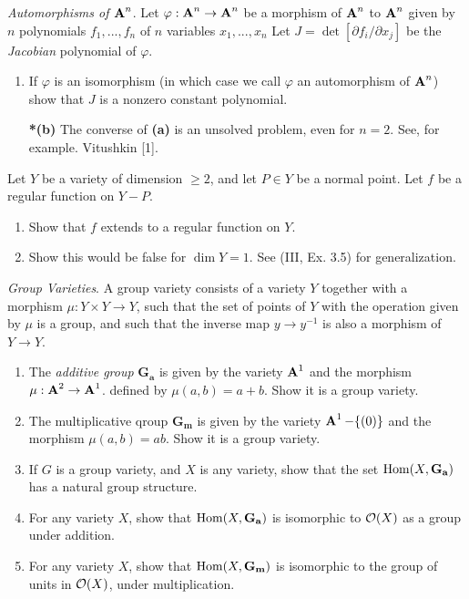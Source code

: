 \documentclass[10pt]{amsart}
\begin{document}
\begin{exercise}[3.19]
    \emph{Automorphisms of $\aa^n$}. Let $\varphi: \aa^n \to \aa^n$ be a morphism of $\aa^n$ to $\aa^n$ given 
    by $n$ polynomials $f_1, ... ,f_n$ of $n$ variables $x_1, ... ,x_n$ Let $J = \det [\partial f_i/\partial x_j] $ 
    be the \emph{Jacobian} polynomial of $\varphi$.
    \begin{enumerate}[itemsep=1pt]
        \item If $\varphi$ is an isomorphism (in which case we call $\varphi$ an automorphism of $\aa^n$) show
        that $J$ is a nonzero constant polynomial.
        \item[{\bf**(b)}] The converse of {\bf (a)} is an unsolved problem, even for $n = 2$. See, for example.
        Vitushkin [1].
    \end{enumerate}
\end{exercise}

\begin{exercise}[3.20]
    Let $Y$ be a variety of dimension $\ge 2$, and let $P \in Y$ be a normal point. Let $f$ be a regular function 
    on $Y - P$.
    \begin{enumerate}[itemsep=1pt]
        \item Show that $f$ extends to a regular function on $Y$.
        \item Show this would be false for $\dim Y = 1$.
        See (III, Ex. 3.5) for generalization.
    \end{enumerate}
\end{exercise}

\begin{exercise}[3.21]
    \emph{Group Varieties}. A group variety consists of a variety $Y$ together with a morphism $\mu: Y \times Y \to Y$, 
    such that the set of points of $Y$ with the operation given by $\mu$ is a group, and such that the inverse 
    map $y \to y^{-1}$ is also a morphism of $Y \to Y$.
    \begin{enumerate}[itemsep=1pt]
        \item The \emph{additive group} $\mathbf{G_a}$ is given by the variety $\aa^1$ 
        and the morphism $\mu: \aa^2 \to \aa^1$.
        defined by $\mu(a,b) = a + b$. Show it is a group variety.
        \item The multiplicative qroup $\mathbf{G_m}$ is given by the variety $\aa^1 - \{(0)\}$ and the 
        morphism $\mu(a, b) = ab$. Show it is a group variety.
        \item If $G$ is a group variety, and $X$ is any variety, show that the set $\Hom(X, \mathbf{G_a})$ has 
        a natural group structure.
        \item For any variety $X$, show that $\Hom(X,\mathbf{G_a})$ is isomorphic to $\cO(X)$ as a group
        under addition.
        \item For any variety $X$, show that $\Hom(X,\mathbf{G_m})$ is isomorphic to the group of units
        in $\cO(X)$, under multiplication.
    \end{enumerate}
\end{exercise}
\end{document}
